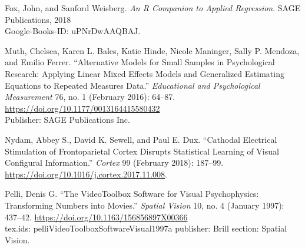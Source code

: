 \documentclass[
  12pt,
]{article}
\newlength{\cslhangindent}
\newenvironment{cslreferences}%
  {\setlength{\parindent}{0pt}%
  \everypar{\setlength{\hangindent}{\cslhangindent}}\ignorespaces}%
  {\par}
\begin{document}
\begin{cslreferences}
\leavevmode\hypertarget{ref-foxCompanionAppliedRegression2018}{}%
Fox, John, and Sanford Weisberg. \emph{An R Companion to Applied Regression}. SAGE Publications, 2018\\
Google-Books-ID: uPNrDwAAQBAJ.

\leavevmode\hypertarget{ref-muthAlternativeModelsSmall2016}{}%
Muth, Chelsea, Karen L. Bales, Katie Hinde, Nicole Maninger, Sally P. Mendoza, and Emilio Ferrer. ``Alternative Models for Small Samples in Psychological Research: Applying Linear Mixed Effects Models and Generalized Estimating Equations to Repeated Measures Data.'' \emph{Educational and Psychological Measurement} 76, no. 1 (February 2016): 64--87. \url{https://doi.org/10.1177/0013164415580432}\\
Publisher: SAGE Publications Inc.

\leavevmode\hypertarget{ref-nydamCathodalElectricalStimulation2018}{}%
Nydam, Abbey S., David K. Sewell, and Paul E. Dux. ``Cathodal Electrical Stimulation of Frontoparietal Cortex Disrupts Statistical Learning of Visual Configural Information.'' \emph{Cortex} 99 (February 2018): 187--99. \url{https://doi.org/10.1016/j.cortex.2017.11.008}.

\leavevmode\hypertarget{ref-pelliVideoToolboxSoftwareVisual1997}{}%
Pelli, Denis G. ``The VideoToolbox Software for Visual Psychophysics: Transforming Numbers into Movies.'' \emph{Spatial Vision} 10, no. 4 (January 1997): 437--42. \url{https://doi.org/10.1163/156856897X00366}\\
tex.ids: pelliVideoToolboxSoftwareVisual1997a publisher: Brill section: Spatial Vision.
\end{cslreferences}
\end{document}
